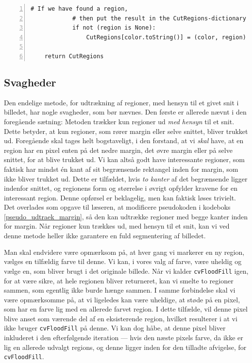 {\begin{lstlisting}[caption={Pseudokode til udtrækning af regioner med
    margin.},captionpos=b,label={pseudo_udtraek_margin},numbers=left,
    frame=single, breaklines=false, float=h]
            # If we have found a region,
            # then put the result in the CutRegions-dictionary
            if not (region is None):
                CutRegions[color.toString()] = (color, region)

    return CutRegions
\end{lstlisting}

\subsection{Svagheder\label{subsec_svagheder}}
Den endelige metode, for udtrækning af regioner, med hensyn til et givet
snit i billedet, har nogle svagheder, som bør nævnes. Den første er
allerede nævnt i den foregående sætning: 
Metoden trækker kun regioner ud \emph{med hensyn} til et snit. Dette
betyder, at kun regioner, som rører margin eller selve snittet, bliver
trukket ud. Foregående skal tages helt bogstaveligt, i den forstand, at
vi \emph{skal} have, at en region har en pixel enten på det nedre margin,
det øvre margin eller på selve snittet, for at blive trukket ud. Vi kan
altså godt have interessante regioner, som faktisk har mindst én kant af
sit begrænsende rektangel inden for margin, som ikke bliver trukket ud.
Dette er tilfældet, hvis \emph{to kanter} af det begrænsende ligger
indenfor snittet, og regionens form og størrelse i øvrigt opfylder
kravene for en interessant region. Denne opførsel er beklagelig, men kan
faktisk løses trivielt. 
Det overlades som opgave til læseren, at modificere pseudokoden i
kodeboks \ref{pseudo_udtraek_margin}, så den kan udtrække regioner med
begge kanter inden for margin.
Når regioner kun trækkes ud, med hensyn til et snit, kan vi ved denne
metode heller ikke garantere en fuld segmentering af billedet.

Man skal endvidere være opmærksom på, at hver gang vi markerer en ny
region, vælges en tilfældig farve til denne. 
Vi kan, i vores valg af farve, være uheldig og vælge en, som bliver
brugt i det originale billede. Når vi kalder \texttt{cvFloodFill} igen,
for at være sikre, at hele regionen bliver returneret, kan vi smelte to
regioner sammen, som egentlig ikke burde hænge sammen. I samme
forbindelse skal vi være opmærksomme på, at vi ligeledes kan være
uheldige, at støde på en pixel, som har en farve lig med en allerede
farvet region. I dette tilfælde, vil denne pixel blive anset som værende
del af en eksisterende region, hvilket resulterer i at vi ikke bruger
\texttt{cvFloodFill} på denne. Vi kan dog håbe, at denne pixel bliver
inkluderet i den efterfølgende iteration --- hvis den næste pixels
farve, da ikke er lig en allerede udvalgt regions, og denne ligger inden
for den tilladte afvigelse, for \texttt{cvFloodFill}.

}
